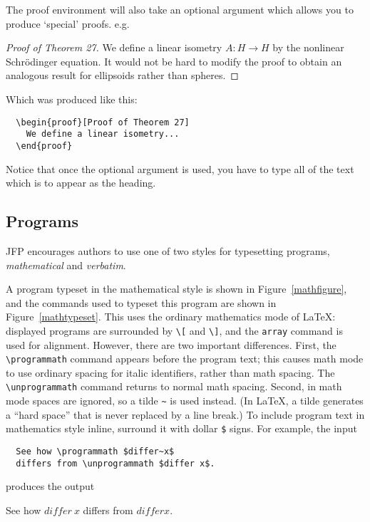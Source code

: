 \documentclass{jfp1}
\begin{document}
The proof environment will also take an optional argument which allows you
to produce `special' proofs. e.g.
%
\begin{proof}[Proof of Theorem 27]
  We define a linear isometry $A:H\rightarrow H$ by the nonlinear
  Schr\"{o}dinger equation. It would not be hard to modify the
  proof to obtain an analogous result for ellipsoids rather than
  spheres.
\end{proof}
%
Which was produced like this:
%
\begin{verbatim}
  \begin{proof}[Proof of Theorem 27]
    We define a linear isometry...
  \end{proof}
\end{verbatim}
%
Notice that once the optional argument is used, you have to type all of
the text which is to appear as the heading.

\subsection{Programs}\label{sec-programs}

JFP encourages authors to use one of two styles for typesetting programs,
\emph{mathematical} and \emph{verbatim}.

A program typeset in the mathematical style is shown in
Figure~\ref{mathfigure}, and the commands used to typeset this program
are shown in Figure~\ref{mathtypeset}.  This uses the ordinary
mathematics mode of \LaTeX: displayed programs are surrounded by
\verb|\[| and \verb|\]|, and the \verb|array| command is used for
alignment.  However, there are two important differences.  First, the
\verb|\programmath| command appears before the program text; this
causes math mode to use ordinary spacing for italic identifiers,
rather than math spacing.  The \verb|\unprogrammath| command returns
to normal math spacing.  Second, in math mode spaces are ignored, so a
tilde \verb|~| is used instead.  (In \LaTeX, a tilde generates a
``hard space'' that is never replaced by a line break.)  To include
program text in mathematics style inline, surround it with dollar
\verb|$| signs.  For example, the input
\begin{verbatim}
  See how \programmath $differ~x$
  differs from \unprogrammath $differ x$.
\end{verbatim}
produces the output
\begin{center}
  See how \programmath $differ~x$
  differs from \unprogrammath $differ x$.
\end{center}
\end{document}
